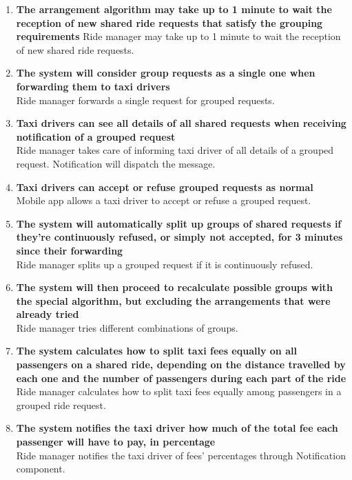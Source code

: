 \begin{enumerate}
	\item \textbf{The arrangement algorithm may take up to 1 minute to wait the reception of new shared ride requests that satisfy the grouping requirements}
	Ride manager may take up to 1 minute to wait the reception of new shared ride requests.
		
	\item \textbf{The system will consider group requests as a single one when forwarding them to taxi drivers}\\
	Ride manager forwards a single request for grouped requests.
	
	\item \textbf{Taxi drivers can see all details of all shared requests when receiving notification of a grouped request}\\
	Ride manager takes care of informing taxi driver of all details of a grouped request. Notification will dispatch the message.
	
	\item \textbf{Taxi drivers can accept or refuse grouped requests as normal}\\
	Mobile app allows a taxi driver to accept or refuse a grouped request.
	
	\item \textbf{The system will automatically split up groups of shared requests if they're continuously refused, or simply not accepted, for 3 minutes since their forwarding}\\
	Ride manager splits up a grouped request if it is continuously refused.  
	
	\item \textbf{The system will then proceed to recalculate possible groups with the special algorithm, but excluding the arrangements that were already tried}\\
	Ride manager tries different combinations of groups.
	
	\item \textbf{The system calculates how to split taxi fees equally on all passengers on a shared ride, depending on the distance travelled by each one and the number of passengers during each part of the ride}\\
	Ride manager calculates how to split taxi fees equally among passengers in a grouped ride request.
	
	\item \textbf{The system notifies the taxi driver how much of the total fee each passenger will have to pay, in percentage}\\
	Ride manager notifies the taxi driver of fees' percentages through Notification component.
	

\end{enumerate}
